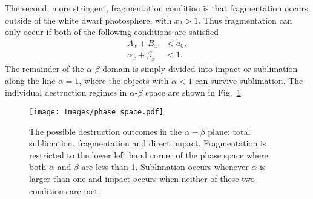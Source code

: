 \documentclass[fleqn,usenatbib]{mnras}
\begin{document}
The second, more stringent, fragmentation condition is that fragmentation occurs outside of the white dwarf photosphere, with $x_2 > 1$.
Thus fragmentation can only occur if both of the following conditions are satisfied
\begin{equation}
    \label{eq:frag_condition}
    \begin{aligned}
     A_x + B_x &< a_0, \\
    \alpha_x + \beta_x &< 1.
    \end{aligned}
\end{equation}
The remainder of the $\alpha$-$\beta$ domain is simply divided into impact or sublimation along the line $\alpha = 1$, where the objects with $\alpha < 1$ can survive sublimation. 
The individual destruction regimes in $\alpha$-$\beta$ space are shown in Fig.~\ref{fig:phase_space}.
\begin{figure}
	\texttt{[image: Images/phase\_space.pdf]}
    \caption{The possible destruction outcomes in the $\alpha-\beta$ plane: total sublimation, fragmentation and direct impact.
    Fragmentation is restricted to the lower left hand corner of the phase space where both $\alpha$ and $\beta$ are less than 1. 
    Sublimation occurs whenever $\alpha$ is larger than one and impact occurs when neither of these two conditions are met.}
    \label{fig:phase_space}
\end{figure}
\end{document}
